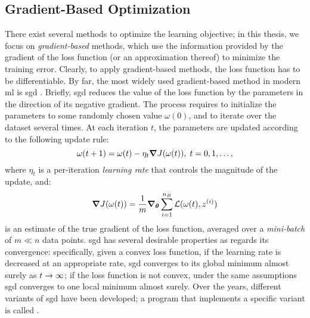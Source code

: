 \subsection{Gradient-Based Optimization}
There exist several methods to optimize the learning objective; in this thesis, we focus on \emph{gradient-based} methods, which use the information provided by the gradient of the loss function (or an approximation thereof) to minimize the training error. Clearly, to apply gradient-based methods, the loss function has to be differentiable. By far, the most widely used gradient-based method in modern \gls{ml} is \gls{sgd} \citep{ruder2016overviewsgd}. Briefly, \gls{sgd} reduces the value of the loss function by  the parameters in the direction of its negative gradient. The process requires to initialize the parameters to some randomly chosen value $\omega(0)$, and to iterate over the dataset several times. At each iteration $t$, the parameters are updated according to the following update rule:
$$ \omega(t+1) = \omega(t) - \eta_t \grad J(\omega(t)),\; t= 0, 1, \ldots,$$
where $\eta_t$ is a per-iteration \emph{learning rate} that controls the magnitude of the update, and:
$$ \grad J(\omega(t)) = \frac{1}{m} \grad_{\Param}  \sum_{i=1}^{n_B} \Loss(\omega(t), z^{(i)})$$
is an estimate of the true gradient of the loss function, averaged over a \emph{mini-batch} of $m \ll n$ data points. \gls{sgd} has several desirable properties as regards its convergence: specifically, given a convex loss function, if the learning rate is decreased at an appropriate rate, \gls{sgd} converges to its global minimum almost surely as $t \shortrightarrow \infty$; if the loss function is not convex, under the same assumptions \gls{sgd} converges to one local minimum almost surely. Over the years, different variants of \gls{sgd} have been developed; a program that implements a specific variant is called .

